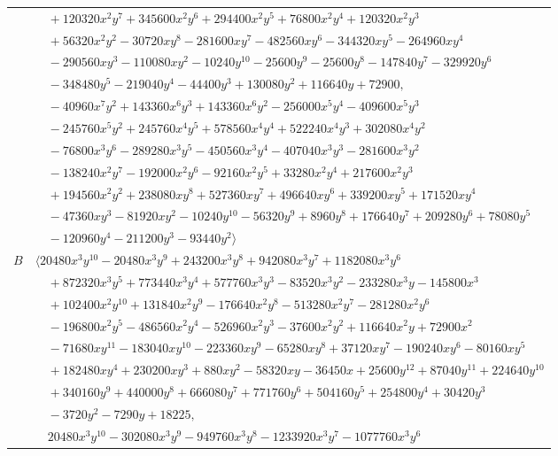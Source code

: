 \documentclass[11pt]{article}
\begin{document}
\begin{longtable}{@{}ll@{}}
 & $\quad +120320x^{2}y^{7}+345600x^{2}y^{6}+294400x^{2}y^{5}+76800x^{2}y^{4}+120320x^{2}y^{3}$\\
 & $\quad +56320x^{2}y^{2}-30720xy^{8}-281600xy^{7}-482560xy^{6}-344320xy^{5}-264960xy^{4}$\\
 & $\quad -290560xy^{3}-110080xy^{2}-10240y^{10}-25600y^{9}-25600y^{8}-147840y^{7}-329920y^{6}$\\
 & $\quad -348480y^{5}-219040y^{4}-44400y^{3}+130080y^{2}+116640y+72900,$\\
 & $\quad -40960x^{7}y^{2}+143360x^{6}y^{3}+143360x^{6}y^{2}-256000x^{5}y^{4}-409600x^{5}y^{3}$\\
 & $\quad -245760x^{5}y^{2}+245760x^{4}y^{5}+578560x^{4}y^{4}+522240x^{4}y^{3}+302080x^{4}y^{2}$\\
 & $\quad -76800x^{3}y^{6}-289280x^{3}y^{5}-450560x^{3}y^{4}-407040x^{3}y^{3}-281600x^{3}y^{2}$\\
 & $\quad -138240x^{2}y^{7}-192000x^{2}y^{6}-92160x^{2}y^{5}+33280x^{2}y^{4}+217600x^{2}y^{3}$\\
 & $\quad +194560x^{2}y^{2}+238080xy^{8}+527360xy^{7}+496640xy^{6}+339200xy^{5}+171520xy^{4}$\\
 & $\quad -47360xy^{3}-81920xy^{2}-10240y^{10}-56320y^{9}+8960y^{8}+176640y^{7}+209280y^{6}+78080y^{5}$\\
 & $\quad -120960y^{4}-211200y^{3}-93440y^{2}\rangle$\\
$B$ & $\langle 20480x^{3}y^{10}-20480x^{3}y^{9}+243200x^{3}y^{8}+942080x^{3}y^{7}+1182080x^{3}y^{6}$\\
 & $\quad +872320x^{3}y^{5}+773440x^{3}y^{4}+577760x^{3}y^{3}-83520x^{3}y^{2}-233280x^{3}y-145800x^{3}$\\
 & $\quad +102400x^{2}y^{10}+131840x^{2}y^{9}-176640x^{2}y^{8}-513280x^{2}y^{7}-281280x^{2}y^{6}$\\
 & $\quad -196800x^{2}y^{5}-486560x^{2}y^{4}-526960x^{2}y^{3}-37600x^{2}y^{2}+116640x^{2}y+72900x^{2}$\\
 & $\quad -71680xy^{11}-183040xy^{10}-223360xy^{9}-65280xy^{8}+37120xy^{7}-190240xy^{6}-80160xy^{5}$\\
 & $\quad +182480xy^{4}+230200xy^{3}+880xy^{2}-58320xy-36450x+25600y^{12}+87040y^{11}+224640y^{10}$\\
 & $\quad +340160y^{9}+440000y^{8}+666080y^{7}+771760y^{6}+504160y^{5}+254800y^{4}+30420y^{3}$\\
 & $\quad -3720y^{2}-7290y+18225,$\\
 & $\quad 20480x^{3}y^{10}-302080x^{3}y^{9}-949760x^{3}y^{8}-1233920x^{3}y^{7}-1077760x^{3}y^{6}$\\

\end{longtable}
\end{document}

